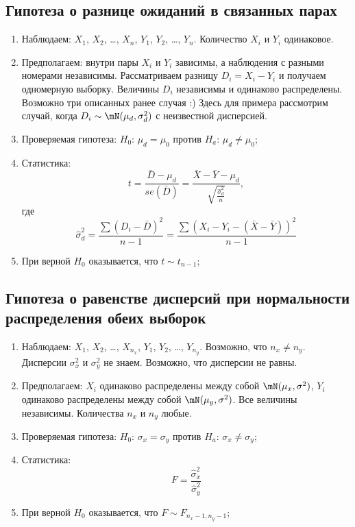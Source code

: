 \documentclass[12pt, a4paper, oneside]{article}
\begin{document}
\subsection*{Гипотеза о разнице ожиданий в связанных парах}

\begin{enumerate}
    \item Наблюдаем: $X_1$, $X_2$, \ldots, $X_{n}$, $Y_1$, $Y_2$, \ldots, $Y_{n}$.
    Количество $X_i$ и $Y_i$ одинаковое.
    \item Предполагаем: внутри пары $X_i$ и $Y_i$ зависимы, а наблюдения с разными номерами независимы.
    Рассматриваем разницу $D_i = X_i - Y_i$ и получаем одномерную выборку.
    Величины $D_i$ независимы и одинаково распределены.
    Возможно три описанных ранее случая :)
    Здесь для примера рассмотрим случай, когда $D_i \sim \mN(\mu_d, \sigma^2_d)$ с неизвестной дисперсией.
    
    \item Проверяемая гипотеза: $H_0$: $\mu_d = \mu_0$ против $H_a$: $\mu_d \neq \mu_0$;
    
    \item Статистика:
    \[
    t = \frac{\bar D - \mu_d}{se(\bar D)} =
    \frac{\bar X - \bar Y - \mu_d}{\sqrt{\frac{\hat \sigma^2_d}{n}}},
    \]
    где
    \[
    \hat \sigma^2_d = \frac{\sum (D_i - \bar D)^2 }{n - 1} = \frac{\sum (X_i - Y_i - (\bar X - \bar Y))^2 }{n - 1}
    \]
    
    \item При верной $H_0$ оказывается, что $t \sim t_{n-1}$;
\end{enumerate}

\subsection*{Гипотеза о равенстве дисперсий при нормальности распределения обеих выборок}

\begin{enumerate}
    \item Наблюдаем: $X_1$, $X_2$, \ldots, $X_{n_x}$, $Y_1$, $Y_2$, \ldots, $Y_{n_y}$.
    Возможно, что $n_x \neq n_y$. Дисперсии $\sigma^2_x$ и $\sigma^2_y$ не знаем. Возможно, что дисперсии не равны.
    
    \item Предполагаем: $X_i$ одинаково распределены между собой $\mN(\mu_x, \sigma^2)$,
    $Y_i$ одинаково распределены между собой $\mN(\mu_y, \sigma^2)$.
    Все величины независимы. Количества $n_x$ и $n_y$ любые.
    
    \item Проверяемая гипотеза: $H_0$: $\sigma_x = \sigma_y$ против $H_a$: $\sigma_x \neq \sigma_y$;
    
    \item Статистика:
    \[
    F = \frac{\hat \sigma^2_x}{\hat \sigma^2_y}
    \]
    
    \item При верной $H_0$ оказывается, что $F \sim F_{n_x-1, n_y - 1}$;
\end{enumerate}
\end{document}
